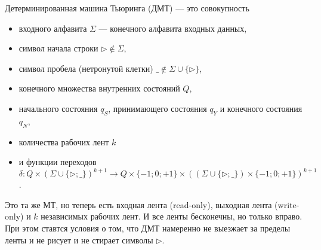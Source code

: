 \documentclass[12pt,a4paper]{article}
\begin{document}
    \begin{definition}
        Детерминированная машина Тьюринга (ДМТ) --- это совокупность
        \begin{itemize}
            \item входного алфавита $\Sigma$ --- конечного алфавита входных данных,
            \item символ начала строки $\triangleright \notin \Sigma$,
            \item символ пробела (нетронутой клетки) $\_ \notin \Sigma \cup \{\triangleright\}$,
            \item конечного множества внутренних состояний $Q$,
            \item начального состояния $q_S$, принимающего состояния $q_Y$ и конечного состояния $q_N$,
            \item количества рабочих лент $k$
            \item и функции переходов $\delta: Q \times (\Sigma \cup \{\triangleright; \_\})^{k+1} \to Q \times \{-1; 0; +1\} \times ((\Sigma \cup \{\triangleright; \_\}) \times \{-1; 0; +1\})^{k+1}$.
        \end{itemize}
        Это та же МТ, но теперь есть входная лента (read-only), выходная лента (write-only) и $k$ независимых рабочих лент. И все ленты бесконечны, но только вправо. При этом ставтся условия о том, что ДМТ намеренно не выезжает за пределы ленты и не рисует и не стирает символы $\triangleright$.


\end{definition}
\end{document}
